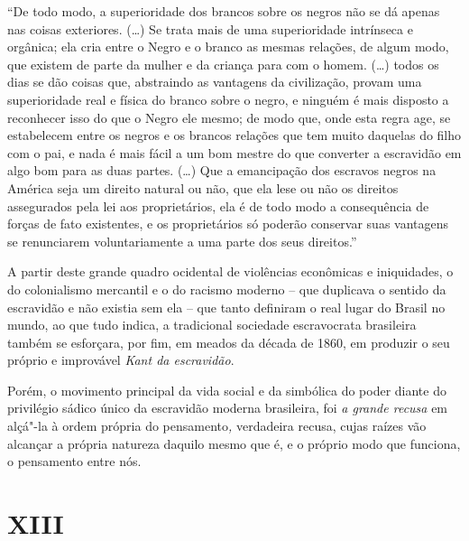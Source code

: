 ``De todo modo, a superioridade dos brancos sobre os negros não se dá
apenas nas coisas exteriores. (\ldots{}) Se trata mais de uma superioridade
intrínseca e orgânica; ela cria entre o Negro e o branco as mesmas
relações, de algum modo, que existem de parte da mulher e da criança
para com o homem. (\ldots{}) todos os dias se dão coisas que, abstraindo as
vantagens da civilização, provam uma superioridade real e física do
branco sobre o negro, e ninguém é mais disposto a reconhecer isso do que
o Negro ele mesmo; de modo que, onde esta regra age, se estabelecem
entre os negros e os brancos relações que tem muito daquelas do filho
com o pai, e nada é mais fácil a um bom mestre do que converter a
escravidão em algo bom para as duas partes. (\ldots{}) Que a emancipação dos
escravos negros na América seja um direito natural ou não, que ela lese
ou não os direitos assegurados pela lei aos proprietários, ela é de todo
modo a consequência de forças de fato existentes, e os proprietários só
poderão conservar suas vantagens se renunciarem voluntariamente a uma
parte dos seus direitos.''

A partir deste grande quadro ocidental de violências econômicas e
iniquidades, o do colonialismo mercantil e o do racismo moderno -- que
duplicava o sentido da escravidão e não existia sem ela -- que tanto
definiram o real lugar do Brasil no mundo, ao que tudo indica, a
tradicional sociedade escravocrata brasileira também se esforçara, por
fim, em meados da década de 1860, em produzir o seu próprio e improvável
\emph{Kant da escravidão}.

Porém, o movimento principal da vida social e da simbólica do poder
diante do privilégio sádico único da escravidão moderna brasileira, foi
\emph{a grande recusa} em alçá"-la à ordem própria do pensamento\emph{,}
verdadeira recusa, cujas raízes vão alcançar a própria natureza daquilo
mesmo que é, e o próprio modo que funciona, o pensamento entre nós.

\section{XIII}

